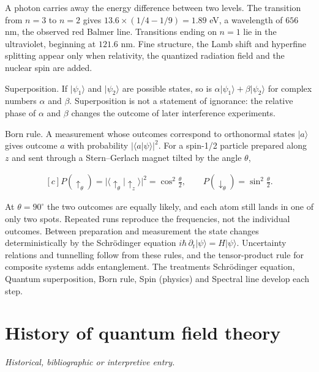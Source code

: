\documentclass[11pt,oneside]{book}
\newenvironment{centeredalign}{\[\begin{gathered}[c]}{\end{gathered}\]}
\newcommand{\ket}[1]{\lvert #1\rangle}
\begin{document}
A photon carries away the energy difference between two levels. The transition from \(n=3\) to \(n=2\) gives \(13.6\times(1/4-1/9)=1.89\) eV, a wavelength of \(656\) nm, the observed red Balmer line. Transitions ending on \(n=1\) lie in the ultraviolet, beginning at \(121.6\) nm. Fine structure, the Lamb shift and hyperfine splitting appear only when relativity, the quantized radiation field and the nuclear spin are added.

Superposition. If \(\ket{\psi_1}\) and \(\ket{\psi_2}\) are possible states, so is \(\alpha\ket{\psi_1}+\beta\ket{\psi_2}\) for complex numbers \(\alpha\) and \(\beta\). Superposition is not a statement of ignorance: the relative phase of \(\alpha\) and \(\beta\) changes the outcome of later interference experiments.

Born rule. A measurement whose outcomes correspond to orthonormal states \(\ket{a}\) gives outcome \(a\) with probability \(|\langle a|\psi\rangle|^2\). For a spin-1/2 particle prepared along \(z\) and sent through a Stern--Gerlach magnet tilted by the angle \(\theta\),

\begin{centeredalign}
P(\uparrow_\theta)=|\langle\uparrow_\theta|\uparrow_z\rangle|^2=\cos^2\frac{\theta}{2},
\qquad P(\downarrow_\theta)=\sin^2\frac{\theta}{2}.
\end{centeredalign}

At \(\theta=90^\circ\) the two outcomes are equally likely, and each atom still lands in one of only two spots. Repeated runs reproduce the frequencies, not the individual outcomes. Between preparation and measurement the state changes deterministically by the Schrödinger equation \(i\hbar\,\partial_t\ket{\psi}=H\ket{\psi}\). Uncertainty relations and tunnelling follow from these rules, and the tensor-product rule for composite systems adds entanglement. The treatments Schrödinger equation, Quantum superposition, Born rule, Spin (physics) and Spectral line develop each step.







\clearpage

\section{History of quantum field theory}

\label{topic:history-of-quantum-field-theory}

\par\smallskip\noindent\textit{Historical, bibliographic or interpretive entry.}
\end{document}
